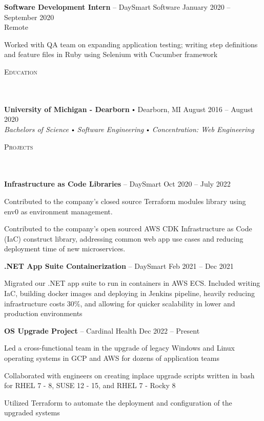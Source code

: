 \documentclass{article}
\newcommand{\header}[1]{{
\hspace*{-15pt}\vspace*{6pt} \textsc{#1}} \vspace*{-6pt} 
\lineunder
}
\newcommand{\lineunder}{
\vspace*{-8pt} \\ \hspace*{-18pt} 
\hrulefill \\
}
\newcommand{\school}[4]{
\textbf{#1} \labelitemi #2 \hfill #3 \\ #4 \vspace*{5pt}
}
\newcommand{\employer}[4]{{
\vspace*{2pt}%
\textbf{#1} #2 \hfill #3\\ #4 \vspace*{2pt}}
}
\newcommand{\project}[3]{{
\vspace*{2pt}%
\textbf{#1} #2 \hfill #3\\ \vspace*{2pt}}
}
\renewcommand{\labelitemi}{
$\vcenter{\hbox{\tiny$\bullet$}}$\hspace*{3pt}
}
\renewcommand{\labelitemii}{
$\vcenter{\hbox{\tiny$\bullet$}}$\hspace*{-3pt}
}
\newenvironment{bullet-list-minor}{
\begin{list}{\labelitemii}{\setlength\leftmargin{15pt} 
\topsep 0pt \itemsep -2pt}}{\vspace*{4pt}\end{list}
}
\begin{document}
    \employer{Software Development Intern}{-- DaySmart Software}{January 2020 -- September 2020}{Remote}
	\begin{bullet-list-minor}
	\item Worked with QA team on expanding application testing; writing step definitions and feature files in Ruby using Selenium with Cucumber framework
	\vspace{2pt}
    \end{bullet-list-minor}

\vspace{4pt}
\header{Education}
    \school{University of Michigan - Dearborn}{Dearborn, MI}{August 2016 -- August 2020}
    {\textit{Bachelors of Science \labelitemi Software Engineering\labelitemi Concentration: Web Engineering}}

\vspace*{8pt}%
\header{Projects}
    
    \project{Infrastructure as Code Libraries}{ -- DaySmart}{ Oct 2020 -- July 2022}
	\begin{bullet-list-minor}
    \item Contributed to the company's closed source Terraform modules library using env0 as environment management.
	\item Contributed to the company's open sourced AWS CDK Infrastructure as Code (IaC) construct library, addressing common web app use cases and reducing deployment time of new microservices.
    \end{bullet-list-minor}
    
    \project{.NET App Suite Containerization}{ -- DaySmart}{ Feb 2021 -- Dec 2021 }
	\begin{bullet-list-minor}
	\item Migrated our .NET app suite to run in containers in AWS ECS. Included writing IaC, building docker images and deploying in Jenkins pipeline, heavily reducing infrastructure costs 30\%, and allowing for quicker scalability in lower and production environments
    \end{bullet-list-minor}
    
    \project{OS Upgrade Project}{ -- Cardinal Health}{ Dec 2022 -- Present}
    \begin{bullet-list-minor}
    \item Led a cross-functional team in the upgrade of legacy Windows and Linux operating systems in GCP and AWS for dozens of application teams
    \item Collaborated with engineers on creating inplace upgrade scripts written in bash for RHEL 7 - 8, SUSE 12 - 15, and RHEL 7 - Rocky 8
    \item Utilized Terraform to automate the deployment and configuration of the upgraded systems
    \end{bullet-list-minor}
\end{document}

